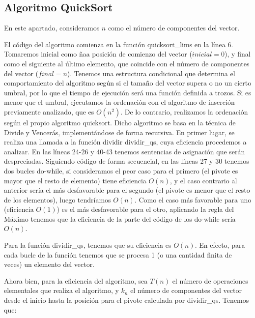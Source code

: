 \documentclass{homework}
\begin{document}
    \subsection{Algoritmo QuickSort}
    
     

    En este apartado, consideramos $n$ como el número de componentes del vector. 

    El código del algoritmo comienza en la función quicksort\_lims en la línea 6. Tomaremos inicial 
    como ñaa posición de comienzo del vector ($inicial = 0$), y final como el siguiente al último elemento, 
    que coincide con el número de componentes del vector ($final = n$).
    Tenemos una estructura condicional que determina el comportamiento del algoritmo según si el tamaño del vector 
    supera o no un cierto umbral, por lo que el tiempo de ejecución será una función definida a trozos. Si es menor 
    que el umbral, ejecutamos la ordenación con el algoritmo de inserción previamente analizado, que es $O(n^2)$. De lo
    contrario, realizamos la ordenación según el propio algoritmo quicksort. Dicho algoritmo se basa en la técnica de Divide
    y Vencerás, implementándose de forma recursiva. En primer lugar, se realiza una llamada a la función dividir dividir\_qs, 
    cuya eficiencia procedemos a analizar. En las líneas 24-26 y 40-43 tenemos sentencias de asignación que serán despreciadas. 
    Siguiendo código de forma secuencial, en las líneas 27 y 30 tenemos dos bucles do-while, si consideramos el peor caso para 
    el primero (el pivote es mayor que el resto de elemento) tiene eficiencia $O(n)$, y el caso contrario al anterior sería el 
    más desfavorable para el segundo (el pivote es menor que el resto de los elementos), luego tendríamos $O(n)$. Como el caso más 
    favorable para uno (eficiencia $O(1)$) es el más desfavorable para el otro, aplicando la regla del Máximo tenemos que la 
    eficiencia de la parte del código de los do-while sería $O(n)$.  
    
    Para la función dividir\_qs, tenemos que su eficiencia es $O(n)$. En efecto, para cada bucle 
    de la función tenemos que se procesa 1 (o una cantidad finita de veces) un elemento del vector. 
    
    Ahora bien, para la eficiencia del algoritmo, sea $T(n)$ el número de operaciones elementales que realiza el algoritmo, y
    $k_n$ el número de componentes del vector desde el inicio hasta la posición para el pivote calculada por dividir\_qs. Tenemos que:
\end{document}
